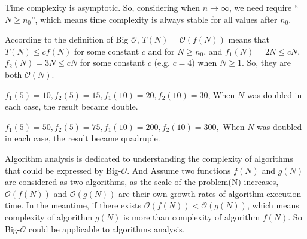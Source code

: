 \begin{homeworkProblem} %

Time complexity is asymptotic. So, considering when $n\rightarrow \infty$, we need require ``$N \geq n_0$'', which means time complexity is always stable for all values after $n_0$.
\end{homeworkProblem}

\begin{homeworkProblem}
According to the definition of Big $\mathcal{O}$, $T(N) = \mathcal{O}(f(N))$ means that $T(N) \leq cf(N)$ for some constant $c$ and for $N \geq n_0$, and $f_1(N) = 2N \leq cN$, $f_2(N) = 3N \leq cN$ for some constant $c$ (e.g. $c = 4$) when $N \geq 1$. So, they are both $\mathcal{O}(N)$.
\end{homeworkProblem}

\begin{homeworkProblem}

\begin{homeworkSubProblem}
$f_1(5) = 10, f_2(5) = 15, f_1(10) = 20, f_2(10) = 30$, When $N$ was doubled in each case, the result became double.
\end{homeworkSubProblem}

\begin{homeworkSubProblem}
$f_1(5) = 50, f_2(5) = 75, f_1(10) = 200, f_2(10) = 300,$ When $N$ was doubled in each case, the result became quadruple.
\end{homeworkSubProblem}
\end{homeworkProblem}

\begin{homeworkProblem}
Algorithm analysis is dedicated to understanding the complexity of algorithms that could be expressed by Big-$\mathcal{O}$. And Assume two functions $f(N)$ and $g(N)$ are considered as two algorithms, as the scale of the problem(N) increases, $\mathcal{O}(f(N))$ and $\mathcal{O}(g(N))$ are their own growth rates of algorithm execution time. In the meantime, if there exists $\mathcal{O}(f(N)) < \mathcal{O}(g(N))$, which means complexity of algorithm $g(N)$ is more than complexity of algorithm $f(N)$. So Big-$\mathcal{O}$ could be applicable to algorithms analysis.
\end{homeworkProblem}

